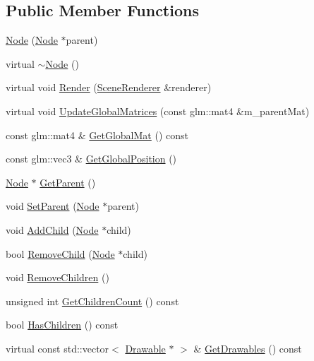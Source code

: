 \subsection*{Public Member Functions}
\begin{DoxyCompactItemize}
\item 
\mbox{\hyperlink{classec_1_1_node_a99fb4715fbc3f193ad5ed88dff15cd0e}{Node}} (\mbox{\hyperlink{classec_1_1_node}{Node}} $\ast$parent)
\item 
virtual \mbox{\hyperlink{classec_1_1_node_a6b2dfa6d2490ec46a5d15a326780889b}{$\sim$\+Node}} ()
\item 
virtual void \mbox{\hyperlink{classec_1_1_node_ac606be4f6d5a899a0b9679b6767ff109}{Render}} (\mbox{\hyperlink{classec_1_1_scene_renderer}{Scene\+Renderer}} \&renderer)
\item 
virtual void \mbox{\hyperlink{classec_1_1_node_ac9970ec0ec03e130da59d0d5376a9855}{Update\+Global\+Matrices}} (const glm\+::mat4 \&m\+\_\+parent\+Mat)
\item 
const glm\+::mat4 \& \mbox{\hyperlink{classec_1_1_node_aafbc9c31eb710b1ac22834792e039435}{Get\+Global\+Mat}} () const
\item 
const glm\+::vec3 \& \mbox{\hyperlink{classec_1_1_node_a0acfd7f3ead66d1694d2147383432da8}{Get\+Global\+Position}} ()
\item 
\mbox{\hyperlink{classec_1_1_node}{Node}} $\ast$ \mbox{\hyperlink{classec_1_1_node_a88919835b03a7055f4c1c50c68b83fac}{Get\+Parent}} ()
\item 
void \mbox{\hyperlink{classec_1_1_node_abda1732f28b0f81df2028d889eb73bdf}{Set\+Parent}} (\mbox{\hyperlink{classec_1_1_node}{Node}} $\ast$parent)
\item 
void \mbox{\hyperlink{classec_1_1_node_a769243d9432b14a0c4362c98f4c89a73}{Add\+Child}} (\mbox{\hyperlink{classec_1_1_node}{Node}} $\ast$child)
\item 
bool \mbox{\hyperlink{classec_1_1_node_a65f938c730afc4f5b4fcceb64ac84416}{Remove\+Child}} (\mbox{\hyperlink{classec_1_1_node}{Node}} $\ast$child)
\item 
void \mbox{\hyperlink{classec_1_1_node_ae91a96819729bc06c17870fa8cca2129}{Remove\+Children}} ()
\item 
unsigned int \mbox{\hyperlink{classec_1_1_node_afc08689badadadcbbca919858994d30b}{Get\+Children\+Count}} () const
\item 
bool \mbox{\hyperlink{classec_1_1_node_add6f4b234aebaeb7d1e76d42234b9831}{Has\+Children}} () const
\item 
virtual const std\+::vector$<$ \mbox{\hyperlink{classec_1_1_drawable}{Drawable}} $\ast$ $>$ \& \mbox{\hyperlink{classec_1_1_node_ab1cd50204e1b38c9c1b31e46d13ea915}{Get\+Drawables}} () const

\end{DoxyCompactItemize}
